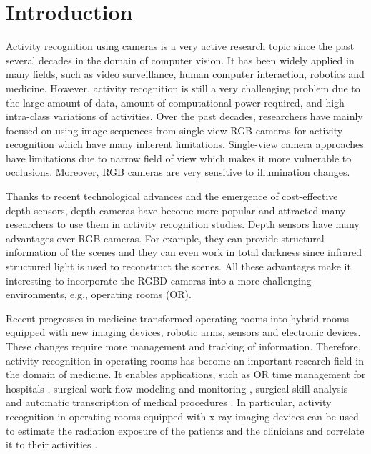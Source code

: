 
\chapter{Introduction} %

\label{Chapter1} %



Activity recognition using cameras is a very active research topic since the past several decades in the domain of computer vision. It has been widely applied in many fields, such as video surveillance, human computer interaction, robotics and medicine. However, activity recognition is still a very challenging problem due to the large amount of data, amount of computational power required, and high intra-class variations of activities. Over the past decades, researchers have mainly focused on using image sequences from single-view RGB cameras for activity recognition which have many inherent limitations. Single-view camera approaches have limitations due to narrow field of view which makes it more vulnerable to occlusions. Moreover, RGB cameras are very sensitive to illumination changes. 

Thanks to recent technological advances and the emergence of cost-effective depth sensors, depth cameras have become more popular and attracted many researchers to use them in activity recognition studies. Depth sensors have many advantages over RGB cameras. For example, they can provide structural information of the scenes and they can even work in total darkness since infrared structured light is used to reconstruct the scenes. All these advantages make it interesting to incorporate the RGBD cameras into a more challenging environments, e.g., operating rooms (OR).

Recent progresses in medicine transformed operating rooms into hybrid rooms equipped with new imaging devices, robotic arms, sensors and electronic devices. These changes require more management and tracking of information. Therefore, activity recognition in operating rooms has become an important research field in the domain of medicine. It enables applications, such as OR time management for hospitals \cite{Bhatia:2007:RIO:1620113.1620126}, surgical work-flow modeling and monitoring \cite{DBLP:journals/tbe/LalysRBJ12, Padoy2012632}, surgical skill analysis \cite{Zappella2013732} and automatic transcription of medical procedures \cite{6553758}. In particular, activity recognition in operating rooms equipped with x-ray imaging devices can be used to estimate  the radiation exposure of the patients and the clinicians and correlate it to their activities \cite{seeingIsBelievingNL}. 

